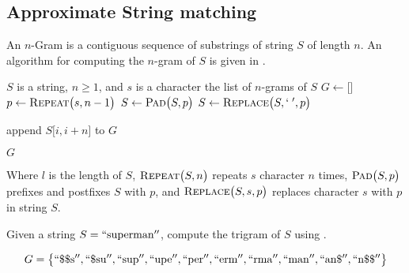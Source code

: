 	\subsection{Approximate String matching}
	\label{sec:n-gram}
		\begin{defn}[N-Gram]
			An $n$-Gram is a contiguous sequence of substrings of string $S$ of length $n$.	 An algorithm for computing the $n$-gram of $S$ is given in . 
		\end{defn}
		

		\begin{algorithm}[!ht]
			\caption{$\textsc{N-Gram}\bigl(S, n, s\bigr)$}
			\label{alg:n-gram}
			
				\begin{algorithmic}[1]
					\REQUIRE $S$ is a string, $n \ge 1$, and $s$ is a character
					\ENSURE the list of $n$-grams of $S$
					\medskip
					\STATE $G \leftarrow \bigl[\bigr]$\label{alg:n-gram:G}
					\STATE $p \leftarrow \textsc{Repeat}\bigl(s, n - 1\bigr)$
					\STATE $S \leftarrow \textsc{Pad}\bigl(S, p\bigr)$
					\STATE $S \leftarrow \textsc{Replace}\bigl(S, `\;', p\bigr)$\label{alg:n-gram:S}
					
						\STATE append $S\bigl[i, i + n\bigr]$ to $G$
					\ENDFOR
					
					\RETURN $G$
				\end{algorithmic}
		\end{algorithm}
		
		
		Where $l$ is the length of $S$, $\textsc{Repeat}\bigl(S, n\bigr)$ repeats $s$ character $n$ times, $\textsc{Pad}\bigl(S, p\bigr)$ prefixes and postfixes $S$ with $p$, and $\textsc{Replace}\bigl(S, s, p\bigr)$ replaces character $s$ with $p$ in string $S$.
		
		\begin{ex}
		\label{ex:ngram-banana}
			Given a string $S = \mathrm{``superman''}$, compute the trigram of $S$ using .
			
			\[
				G = \bigl\{
					\mathrm{``\char"24\char"24s''},
					\mathrm{``\char"24su''},
					\mathrm{``sup''},
					\mathrm{``upe''},
					\mathrm{``per''},
					\mathrm{``erm''},
					\mathrm{``rma''},
					\mathrm{``man''},
					\mathrm{``an\char"24''},
					\mathrm{``n\char"24\char"24''}
				\bigr\}
			\]
		\end{ex}
		
